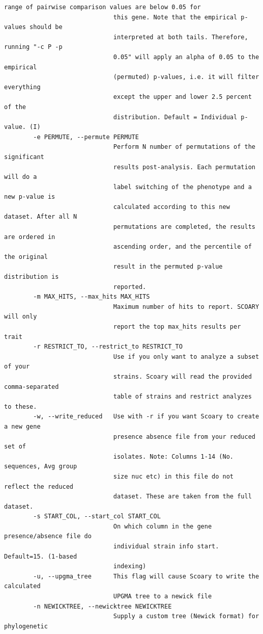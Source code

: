 \documentclass{article}
\begin{document}
\begin{lstlisting}[basicstyle=\fontsize{6}{11}\ttfamily,breaklines]
                              range of pairwise comparison values are below 0.05 for
                              this gene. Note that the empirical p-values should be
                              interpreted at both tails. Therefore, running "-c P -p
                              0.05" will apply an alpha of 0.05 to the empirical
                              (permuted) p-values, i.e. it will filter everything
                              except the upper and lower 2.5 percent of the
                              distribution. Default = Individual p-value. (I)
        -e PERMUTE, --permute PERMUTE
                              Perform N number of permutations of the significant
                              results post-analysis. Each permutation will do a
                              label switching of the phenotype and a new p-value is
                              calculated according to this new dataset. After all N
                              permutations are completed, the results are ordered in
                              ascending order, and the percentile of the original
                              result in the permuted p-value distribution is
                              reported.
        -m MAX_HITS, --max_hits MAX_HITS
                              Maximum number of hits to report. SCOARY will only
                              report the top max_hits results per trait
        -r RESTRICT_TO, --restrict_to RESTRICT_TO
                              Use if you only want to analyze a subset of your
                              strains. Scoary will read the provided comma-separated
                              table of strains and restrict analyzes to these.
        -w, --write_reduced   Use with -r if you want Scoary to create a new gene
                              presence absence file from your reduced set of
                              isolates. Note: Columns 1-14 (No. sequences, Avg group
                              size nuc etc) in this file do not reflect the reduced
                              dataset. These are taken from the full dataset.
        -s START_COL, --start_col START_COL
                              On which column in the gene presence/absence file do
                              individual strain info start. Default=15. (1-based
                              indexing)
        -u, --upgma_tree      This flag will cause Scoary to write the calculated
                              UPGMA tree to a newick file
        -n NEWICKTREE, --newicktree NEWICKTREE
                              Supply a custom tree (Newick format) for phylogenetic

\end{lstlisting}
\end{document}

